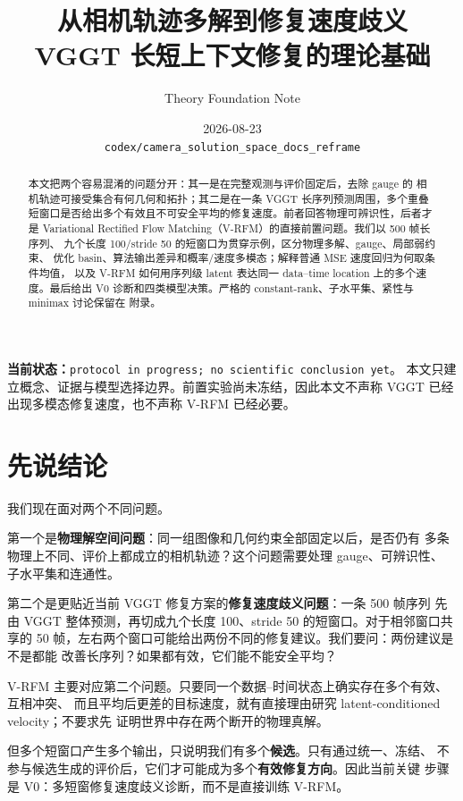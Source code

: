 \documentclass[UTF8,a4paper,11pt]{ctexart}
\title{\bfseries\color{GlobalBlue}从相机轨迹多解到修复速度歧义\\[0.45em]
\large VGGT 长短上下文修复的理论基础}
\author{Theory Foundation Note}
\date{2026-08-23\\[0.25em]
\texttt{codex/camera\_solution\_space\_docs\_reframe}}
\begin{document}
\maketitle

\begin{statusbox}
\textbf{当前状态：}\texttt{protocol in progress; no scientific conclusion yet}。
本文只建立概念、证据与模型选择边界。前置实验尚未冻结，因此本文不声称 VGGT
已经出现多模态修复速度，也不声称 V-RFM 已经必要。
\end{statusbox}

\begin{abstract}
本文把两个容易混淆的问题分开：其一是在完整观测与评价固定后，去除 gauge 的
相机轨迹可接受集合有何几何和拓扑；其二是在一条 VGGT 长序列预测周围，多个重叠
短窗口是否给出多个有效且不可安全平均的修复速度。前者回答物理可辨识性，后者才是
Variational Rectified Flow Matching（V-RFM）的直接前置问题。我们以 500 帧长序列、
九个长度 100/stride 50 的短窗口为贯穿示例，区分物理多解、gauge、局部弱约束、
优化 basin、算法输出差异和概率/速度多模态；解释普通 MSE 速度回归为何取条件均值，
以及 V-RFM 如何用序列级 latent 表达同一 data--time location 上的多个速度。最后给出
V0 诊断和四类模型决策。严格的 constant-rank、子水平集、紧性与 minimax 讨论保留在
附录。
\end{abstract}

\tableofcontents
\newpage

\section{先说结论}

我们现在面对两个不同问题。

第一个是\textbf{物理解空间问题}：同一组图像和几何约束全部固定以后，是否仍有
多条物理上不同、评价上都成立的相机轨迹？这个问题需要处理 gauge、可辨识性、
子水平集和连通性。

第二个是更贴近当前 VGGT 修复方案的\textbf{修复速度歧义问题}：一条 500 帧序列
先由 VGGT 整体预测，再切成九个长度 100、stride 50 的短窗口。对于相邻窗口共享的
50 帧，左右两个窗口可能给出两份不同的修复建议。我们要问：两份建议是不是都能
改善长序列？如果都有效，它们能不能安全平均？

\begin{keybox}
V-RFM 主要对应第二个问题。只要同一个数据--时间状态上确实存在多个有效、互相冲突、
而且平均后更差的目标速度，就有直接理由研究 latent-conditioned velocity；不要求先
证明世界中存在两个断开的物理真解。
\end{keybox}

但多个短窗口产生多个输出，只说明我们有多个\textbf{候选}。只有通过统一、冻结、
不参与候选生成的评价后，它们才可能成为多个\textbf{有效修复方向}。因此当前关键
步骤是 V0：多短窗修复速度歧义诊断，而不是直接训练 V-RFM。
\end{document}
